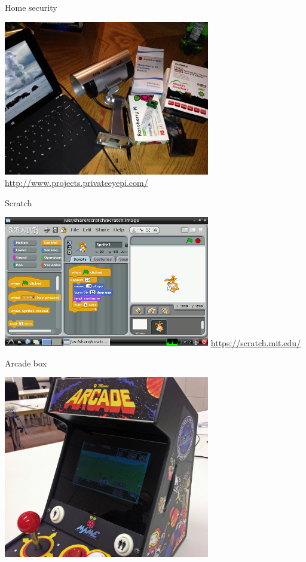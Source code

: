 \documentclass[xcolor=svgnames,11pt]{beamer}
\begin{document}
\begin{frame}{Home security}
\begin{center}
\includegraphics[width=9cm]{uc/security.jpg}
\newline
\medskip
\url{http://www.projects.privateeyepi.com/}
\end{center}
\end{frame}

\begin{frame}{Scratch}
\begin{center}
\includegraphics[width=9cm]{uc/scratch.png}
\newline
\medskip
\url{https://scratch.mit.edu/}
\end{center}
\end{frame}

\begin{frame}{Arcade box}
\begin{center}
\includegraphics[width=9cm]{uc/arcade.jpg}
\end{center}
\end{frame}
\end{document}
